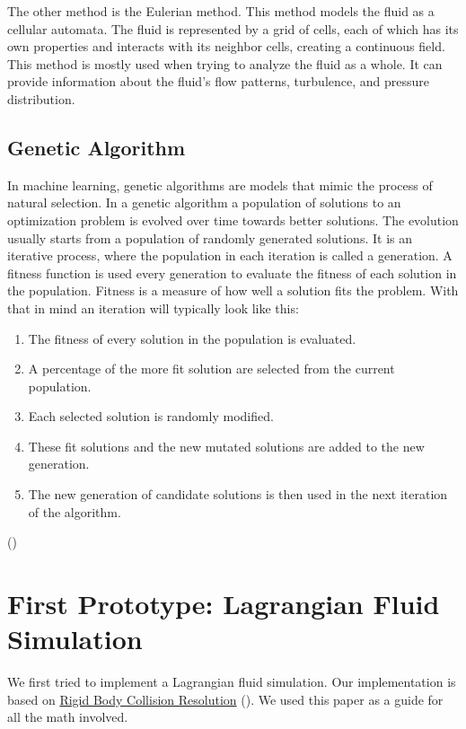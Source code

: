 \documentclass[a4paper,12pt,titlepage]{article}
\begin{document}
The other method is the Eulerian method. This method models the fluid as a
cellular automata. The fluid is represented by a grid of cells, each of which
has its own properties and interacts with its neighbor cells, creating a continuous
field. This method is mostly used when trying to analyze the fluid as a whole.
It can provide information about the fluid's flow patterns, turbulence, and pressure distribution. 

\subsection{Genetic Algorithm} \label{genalgsec}
In machine learning, genetic algorithms are models that mimic the process of natural selection.
In a genetic algorithm a population of solutions to an optimization problem is evolved over time towards better solutions.
The evolution usually starts from a population of randomly generated solutions.
It is an iterative process, where the population in each iteration is called a generation.
A fitness function is used every generation to evaluate the fitness of each solution in the population.
Fitness is a measure of how well a solution fits the problem.
With that in mind an iteration will typically look like this:
\begin{enumerate}
	\item{The fitness of every solution in the population is evaluated.}
	\item{A percentage of the more fit solution are selected from the current population.}
	\item{Each selected solution is randomly modified.}
	\item {These fit solutions and the new mutated solutions are added to the new generation.}
	\item{The new generation of candidate solutions is then used in the next iteration of the algorithm.}
\end{enumerate}
(\cite{genalg})

\pagebreak
\section{First Prototype: Lagrangian Fluid Simulation}
We first tried to implement a Lagrangian fluid simulation.
Our implementation is based on \hyperlink{http://www.hakenberg.de/diffgeo/collision_resolution.htm}{Rigid Body Collision Resolution}
(\cite{hakenberg}). We used this paper as a guide for all the math involved.
\end{document}
